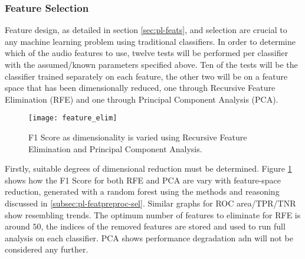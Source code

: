         \subsubsection{Feature Selection}
        \label{subsubsec:exp-clf-opt-featsel}
            Feature design, as detailed in section \ref{sec:pl-feats}, and selection are crucial to any machine learning problem using traditional classifiers. In order to determine which of the audio features to use, twelve tests will be performed per classifier with the assumed/known parameters specified above. Ten of the tests will be the classifier trained separately on each feature, the other two will be on a feature space that has been dimensionally reduced, one through Recursive Feature Elimination (RFE) and one through Principal Component Analysis (PCA).
            
            \begin{figure}[ht]
                \centering
                \texttt{[image: feature\_elim]}
                \caption{F1 Score as dimensionality is varied using Recursive Feature Elimination and Principal Component Analysis.}
                \label{fig:exp-clf-opt-featsel}
            \end{figure}
            
            Firstly, suitable degrees of dimensional reduction must be determined. Figure \ref{fig:exp-clf-opt-featsel} shows how the F1 Score for both RFE and PCA are vary with feature-space reduction, generated with a random forest using the methods and reasoning discussed in \ref{subsec:pl-featpreproc-sel}. Similar graphs for ROC area/TPR/TNR show resembling trends. The optimum number of features to eliminate for RFE is around $50$, the indices of the removed features are stored and used to run full analysis on each classifier. PCA shows performance degradation adn will not be considered any further.
            
            

